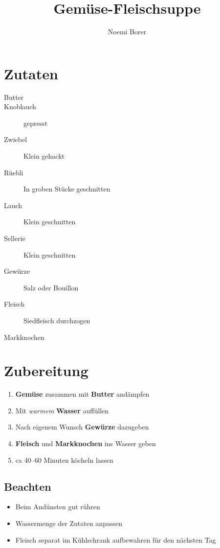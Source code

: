 \documentclass[]{scrartcl}
\title{Gemüse-Fleischsuppe}
\author{Noemi Borer}
\newcommand{\zutat}[1]{\textbf{#1}}
\begin{document}
\maketitle

\section*{Zutaten}
\begin{description}
	\item [Butter]
	\item [Knoblauch] gepresst
	\item [Zwiebel] Klein gehackt
	\item [Rüebli] In groben Stücke geschnitten
	\item [Lauch] Klein geschnitten
	\item [Sellerie] Klein geschnitten
	\item [Gewürze] Salz oder Bouillon
	\item [Fleisch] Siedfleisch durchzogen
	\item [Markknochen]
	
\end{description}

\section*{Zubereitung}
\begin{enumerate}
	\item \zutat{Gemüse} zusammen mit \zutat{Butter} andämpfen
	\item Mit \emph{warmem} \zutat{Wasser} auffüllen
	\item Nach eigenem Wunsch \zutat{Gewürze} dazugeben
	\item \zutat{Fleisch} und \zutat{Markknochen} ins Wasser geben
	\item ca 40--60 Minuten köcheln lassen
\end{enumerate}

\subsection*{Beachten}
\begin{itemize}
	\item Beim Andünsten gut rühren 
	\item Wassermenge der Zutaten anpassen
	\item Fleisch separat im Kühlschrank aufbewahren für den nächsten Tag
\end{itemize}
\end{document}
